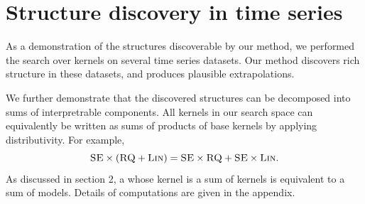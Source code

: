 \documentclass[twoside]{article}
\begin{document}
\section{Structure discovery in time series}
\label{sec:time_series}


As a demonstration of the structures discoverable by our method, we performed the search over kernels on several time series datasets.
Our method discovers rich structure in these datasets, and produces plausible extrapolations.  

We further demonstrate that the discovered structures can be decomposed into sums of interpretrable components.  
All kernels in our search space can equivalently be written as sums of products of base kernels by applying distributivity.
For example,
\[{\textsc{SE} \times (\textsc{RQ} + \textsc{Lin}) = \textsc{SE} \times \textsc{RQ} + \textsc{SE} \times \textsc{Lin}}.\]
As discussed in section 2, a \gp{} whose kernel is a sum of kernels is equivalent to a sum of \gp{} models.
Details of computations are given in the appendix.


\end{document}
